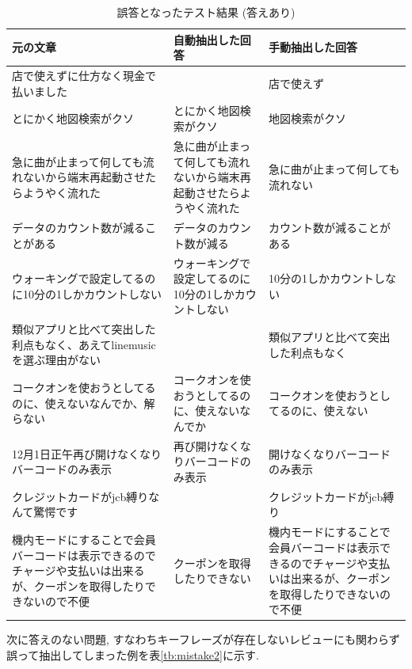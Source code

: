 \begin{table}[H]
  \caption{誤答となったテスト結果 (答えあり) }
  \small
  \label{tb:mistake}
  \begin{center}
  \begin{tabularx}{\linewidth}{X|X|X}
    \hline
    元の文章&自動抽出した回答&手動抽出した回答\\\hline\hline
    店で使えずに仕方なく現金で払いました&&店で使えず\\\hline
    とにかく地図検索がクソ&とにかく地図検索がクソ&地図検索がクソ\\\hline
    急に曲が止まって何しても流れないから端末再起動させたらようやく流れた&急に曲が止まって何しても流れないから端末再起動させたらようやく流れた&急に曲が止まって何しても流れない\\\hline
    データのカウント数が減ることがある&データのカウント数が減る&カウント数が減ることがある\\\hline
    ウォーキングで設定してるのに10分の1しかカウントしない&ウォーキングで設定してるのに10分の1しかカウントしない&10分の1しかカウントしない\\\hline
    類似アプリと比べて突出した利点もなく、あえてlinemusicを選ぶ理由がない&&類似アプリと比べて突出した利点もなく\\\hline
    コークオンを使おうとしてるのに、使えないなんでか、解らない&コークオンを使おうとしてるのに、使えないなんでか&コークオンを使おうとしてるのに、使えない\\\hline
    12月1日正午再び開けなくなりバーコードのみ表示&再び開けなくなりバーコードのみ表示&開けなくなりバーコードのみ表示\\\hline
    クレジットカードがjcb縛りなんて驚愕です&&クレジットカードがjcb縛り\\\hline
    機内モードにすることで会員バーコードは表示できるのでチャージや支払いは出来るが、クーポンを取得したりできないので不便&クーポンを取得したりできない&機内モードにすることで会員バーコードは表示できるのでチャージや支払いは出来るが、クーポンを取得したりできないので不便\\\hline
  \end{tabularx}\end{center}
\end{table}

次に答えのない問題, すなわちキーフレーズが存在しないレビューにも関わらず誤って抽出してしまった例を表\ref{tb:mistake2}に示す.

